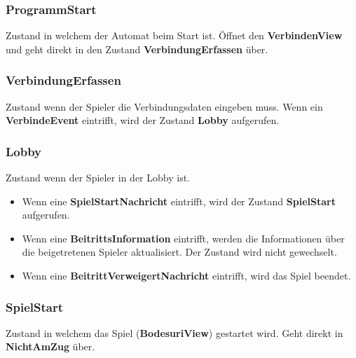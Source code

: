 \documentclass[12pt,halfparskip]{scrartcl}
\begin{document}
\subsubsection{ProgrammStart}
\label{ssub:programmstart}
Zustand in welchem der Automat beim Start ist. Öffnet den \textbf{VerbindenView} und geht direkt in den Zustand \textbf{VerbindungErfassen} über.


\subsubsection{VerbindungErfassen}
\label{ssub:verbinungerfassen}
Zustand wenn der Spieler die Verbindungsdaten eingeben muss. Wenn ein \textbf{VerbindeEvent} eintrifft, wird der Zustand \textbf{Lobby} aufgerufen.

\subsubsection{Lobby}
\label{ssub:lobby}
Zustand wenn der Spieler in der Lobby ist.
\begin{itemize}
	\item Wenn eine \textbf{SpielStartNachricht} eintrifft, wird der Zustand \textbf{SpielStart} aufgerufen.
	\item Wenn eine \textbf{BeitrittsInformation} eintrifft, werden die Informationen über die beigetretenen Spieler aktualisiert. Der Zustand wird nicht gewechselt.
	\item Wenn eine \textbf{BeitrittVerweigertNachricht} eintrifft, wird das Spiel beendet.
\end{itemize}

\subsubsection{SpielStart}
\label{ssub:spielstart}
Zustand in welchem das Spiel (\textbf{BodesuriView}) gestartet wird. Geht direkt in \textbf{NichtAmZug} über.
\end{document}
